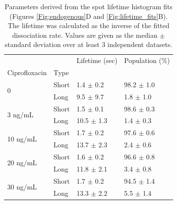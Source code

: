 \begin{table}[htbp]
    \centering
    \begin{tabular}{llll}
        \toprule
         &  & Lifetime (sec) & Population (\%) \\
        Ciprofloxacin & Type &  &  \\
        \midrule
        \multirow[t]{2}{*}{0} & Short & 1.4 $\pm$ 0.2 & 98.2 $\pm$ 1.0 \\
         & Long & 9.5 $\pm$ 9.7 & 1.8 $\pm$ 1.0 \\
        \cline{1-4}
        \multirow[t]{2}{*}{3 ng/mL} & Short & 1.5 $\pm$ 0.1 & 98.6 $\pm$ 0.3 \\
         & Long & 10.5 $\pm$ 1.3 & 1.4 $\pm$ 0.3 \\
        \cline{1-4}
        \multirow[t]{2}{*}{10 ng/mL} & Short & 1.7 $\pm$ 0.2 & 97.6 $\pm$ 0.6 \\
         & Long & 13.7 $\pm$ 2.3 & 2.4 $\pm$ 0.6 \\
        \cline{1-4}
        \multirow[t]{2}{*}{20 ng/mL} & Short & 1.6 $\pm$ 0.2 & 96.6 $\pm$ 0.8 \\
         & Long & 11.8 $\pm$ 2.1 & 3.4 $\pm$ 0.8 \\
        \cline{1-4}
        \multirow[t]{2}{*}{30 ng/mL} & Short & 1.7 $\pm$ 0.2 & 94.5 $\pm$ 1.4 \\
         & Long & 13.3 $\pm$ 2.2 & 5.5 $\pm$ 1.4 \\
        \cline{1-4}
        \bottomrule
        \end{tabular}
    \caption{Parameters derived from the spot lifetime histogram fits (Figures \ref{Fig:endogenous}D and \ref{Fig:lifetime_fits}B). The lifetime was calculated as the inverse of the fitted dissociation rate. Values are given as the median $\pm$ standard deviation over at least 3 independent datasets.}
    \label{tab:fit_results}
\end{table}

